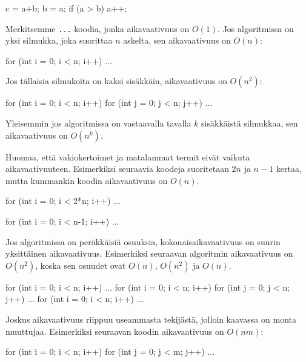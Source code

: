 \begin{code}
c = a+b;
b = a;
if (a > b) a++;
\end{code}

Merkitsemme \texttt{...} koodia,
jonka aikavaativuus on $O(1)$.
Jos algoritmissa on yksi silmukka,
joka suorittaa $n$ askelta,
sen aikavaativuus on $O(n)$:

\begin{code}
for (int i = 0; i < n; i++) {
    ...
}
\end{code}

Jos tällaisia silmukoita on kaksi sisäkkäin,
aikavaativuus on $O(n^2)$:

\begin{code}
for (int i = 0; i < n; i++) {
    for (int j = 0; j < n; j++) {
        ...
    }
}
\end{code}

Yleisemmin jos algoritmissa on vastaavalla tavalla
$k$ sisäkkäistä silmukkaa,
sen aikavaativuus on $O(n^k)$.

Huomaa, että vakiokertoimet ja matalammat termit eivät vaikuta aikavaativuuteen.
Esimerkiksi seuraavia koodeja suoritetaan $2n$ ja $n-1$ kertaa,
mutta kummankin koodin aikavaativuus on $O(n)$.

\begin{code}
for (int i = 0; i < 2*n; i++) {
    ...
}
\end{code}

\begin{code}
for (int i = 0; i < n-1; i++) {
    ...
}
\end{code}

Jos algoritmissa on peräkkäisiä osuuksia, kokonaisaikavaativuus on suurin
yksittäinen aikavaativuus. Esimerkiksi seuraavan algoritmin aikavaativuus on $O(n^2)$,
koska sen osuudet ovat $O(n)$, $O(n^2)$ ja $O(n)$.

\begin{code}
for (int i = 0; i < n; i++) {
    ...
}
for (int i = 0; i < n; i++) {
    for (int j = 0; j < n; j++) {
        ...
    }
}
for (int i = 0; i < n; i++) {
    ...
}
\end{code}

Joskus aikavaativuus riippuu useammasta tekijästä,
jolloin kaavassa on monta muuttujaa.
Esimerkiksi seuraavan koodin aikavaativuus on $O(nm)$:

\begin{code}
for (int i = 0; i < n; i++) {
    for (int j = 0; j < m; j++) {
        ...
    }
}
\end{code}

